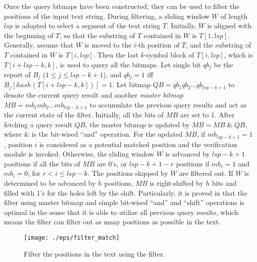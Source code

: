 Once the query bitmaps have been constructed, they can be used to
filter the positions of the input text string. During filtering, a
sliding window $W$ of length $lsp$ is adopted to select a segment of
the text string $T$. Initially, $W$ is aligned with the beginning of
$T$, so that the substring of $T$ contained in $W$ is $T[1,lsp]$.
Generally, assume that $W$ is moved to the $i$-th position of $T$, and
the substring of $T$ contained in $W$ is $T[i,lsp]$. Then the last
$k$-symbol block of $T[i,lsp]$, which is $T[i+lsp-k, k]$, is used to
query all the bitmaps. Let single bit $qb_j$ be the report of $B_j$
($1 \leq j \leq lsp - k + 1$), and $qb_j=1$ iff
$B_j[hash(T[i+lsp-k,k])] = 1$. Let bitmap
$QB = qb_1qb_2 \dots qb_{lsp-k+1}$ to denote the current query result
and another \emph{master bitmap} $MB = mb_1mb_2 \dots mb_{lsp-k+1}$ to
accumulate the previous query results and act as the current state of
the filter. Initially, all the bits of $MB$ are set to 1. After
fetching a query result $QB$, the master bitmap is updated by
$MB = MB \; \& \; QB$, where \& is the bit-wised ``and''
operation. For the updated $MB$, if $mb_{lsp-k+1} = 1$, position $i$
is considered as a potential matched position and the verification
module is invoked. Otherwise, the sliding window $W$ is advanced by
$lsp-k+1$ positions if all the bits of $MB$ are 0's, or $lsp-k+1-r$
positions if $mb_r=1$ and $mb_i=0$, for $r < i \leq lsp-k$. The
positions skipped by $W$ are filtered out. If $W$ is determined to be
advanced by $h$ positions, $MB$ is right-shifted by $h$ bits and
filled with 1's for the holes left by the shift. Particularly, it is
proved in \cite{Lee2013} that the filter using master bitmap and
simple bit-wised ``and'' and ``shift'' operations is optimal in the
sense that it is able to utilize all previous query results, which
means the filter can filter out as many positions as possible in the
text.

\begin{figure}[htbp]
  \centering
  \texttt{[image: ./eps/filter\_match]}
  \caption{Filter the positions in the text using the filter.}
  \label{fig:f_match}
\end{figure}


